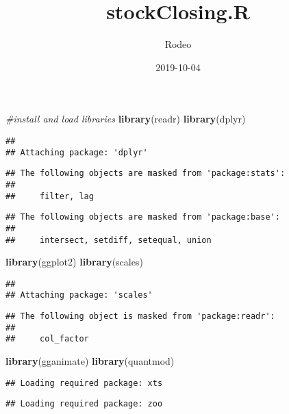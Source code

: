 \documentclass[]{article}
\title{stockClosing.R}
\author{Rodeo}
\date{2019-10-04}
\newenvironment{Shaded}{\begin{snugshade}}{\end{snugshade}}
\newcommand{\CommentTok}[1]{\textcolor[rgb]{0.56,0.35,0.01}{\textit{#1}}}
\newcommand{\KeywordTok}[1]{\textcolor[rgb]{0.13,0.29,0.53}{\textbf{#1}}}
\newcommand{\NormalTok}[1]{#1}
\begin{document}
\maketitle

\begin{Shaded}
\begin{Highlighting}[]
\CommentTok{#install and load libraries}
\KeywordTok{library}\NormalTok{(readr)}
\KeywordTok{library}\NormalTok{(dplyr)}
\end{Highlighting}
\end{Shaded}

\begin{verbatim}
## 
## Attaching package: 'dplyr'
\end{verbatim}

\begin{verbatim}
## The following objects are masked from 'package:stats':
## 
##     filter, lag
\end{verbatim}

\begin{verbatim}
## The following objects are masked from 'package:base':
## 
##     intersect, setdiff, setequal, union
\end{verbatim}

\begin{Shaded}
\begin{Highlighting}[]
\KeywordTok{library}\NormalTok{(ggplot2)}
\KeywordTok{library}\NormalTok{(scales)}
\end{Highlighting}
\end{Shaded}

\begin{verbatim}
## 
## Attaching package: 'scales'
\end{verbatim}

\begin{verbatim}
## The following object is masked from 'package:readr':
## 
##     col_factor
\end{verbatim}

\begin{Shaded}
\begin{Highlighting}[]
\KeywordTok{library}\NormalTok{(gganimate)}
\KeywordTok{library}\NormalTok{(quantmod)}
\end{Highlighting}
\end{Shaded}

\begin{verbatim}
## Loading required package: xts
\end{verbatim}

\begin{verbatim}
## Loading required package: zoo
\end{verbatim}
\end{document}
